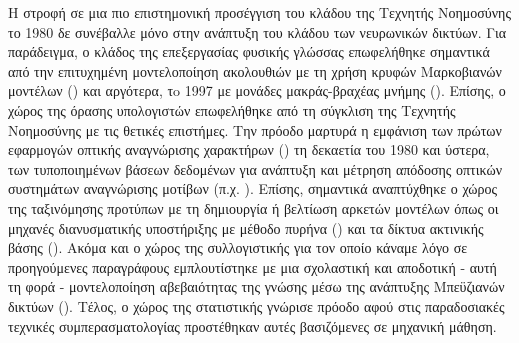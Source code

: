 Η στροφή σε μια πιο επιστημονική προσέγγιση του κλάδου της Τεχνητής Νοημοσύνης το 1980 δε συνέβαλλε μόνο στην ανάπτυξη του κλάδου των νευρωνικών δικτύων. Για παράδειγμα, ο κλάδος της επεξεργασίας φυσικής γλώσσας επωφελήθηκε σημαντικά από την επιτυχημένη μοντελοποίηση ακολουθιών με τη χρήση κρυφών Μαρκοβιανών μοντέλων () και αργότερα, τo 1997 με μονάδες μακράς-βραχέας μνήμης (). Επίσης, ο χώρος της όρασης υπολογιστών επωφελήθηκε από τη σύγκλιση της Τεχνητής Νοημοσύνης με τις θετικές επιστήμες. Την πρόοδο μαρτυρά η εμφάνιση των πρώτων εφαρμογών οπτικής αναγνώρισης χαρακτήρων () τη δεκαετία του 1980 και ύστερα, των τυποποιημένων βάσεων δεδομένων για ανάπτυξη και μέτρηση απόδοσης οπτικών συστημάτων αναγνώρισης μοτίβων (π.χ. ). Επίσης, σημαντικά αναπτύχθηκε ο χώρος της ταξινόμησης προτύπων με τη δημιουργία ή βελτίωση αρκετών μοντέλων όπως οι μηχανές διανυσματικής υποστήριξης με μέθοδο πυρήνα () και τα δίκτυα ακτινικής βάσης (). Ακόμα και ο χώρος της συλλογιστικής για τον οποίο κάναμε λόγο σε προηγούμενες παραγράφους εμπλουτίστηκε με μια σχολαστική και αποδοτική - αυτή τη φορά - μοντελοποίηση αβεβαιότητας της γνώσης μέσω της ανάπτυξης Μπεϋζιανών δικτύων (). Τέλος, ο χώρος της στατιστικής γνώρισε πρόοδο αφού στις παραδοσιακές τεχνικές συμπερασματολογίας προστέθηκαν αυτές βασιζόμενες σε μηχανική μάθηση.
\par

